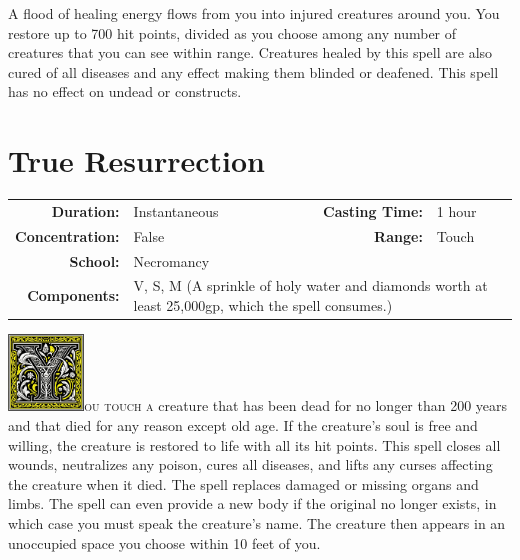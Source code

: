 \documentclass[12pt,showtrims]{memoir}
\begin{document}
\vspace{1\baselineskip}\noindent A flood of healing energy flows from you into injured creatures around you. You restore up to 700 hit points, divided as you choose among any number of creatures that you can see within range. Creatures healed by this spell are also cured of all diseases and any effect making them blinded or deafened. This spell has no effect on undead or constructs.

\newpage
{}
\newpage
\section*{True Resurrection}

{
\small\centering\vspace{-6pt}
\begin{tabular}{rlrl}
\toprule

\textbf{Duration:} & Instantaneous &
\textbf{Casting Time:} & 1 hour \\
\textbf{Concentration:} & False &
\textbf{Range:} & Touch \\
\textbf{School:} & Necromancy \\
\textbf{Components:} & \multicolumn{3}{p{0.7\textwidth}}{V, S, M (A sprinkle of holy water and diamonds worth at least 25,000gp, which the spell consumes.)}\\

\bottomrule
\end{tabular}
}
\vspace{1\baselineskip}\noindent 
\lettrine[lines=4]{\includegraphics[height=58pt]{initials/Y.png}}{ou touch a} creature that has been dead for no longer than 200 years and that died for any reason except old age. If the creature's soul is free and willing, the creature is restored to life with all its hit points. This spell closes all wounds, neutralizes any poison, cures all diseases, and lifts any curses affecting the creature when it died. The spell replaces damaged or missing organs and limbs. The spell can even provide a new body if the original no longer exists, in which case you must speak the creature's name. The creature then appears in an unoccupied space you choose within 10 feet of you.

\newpage
\end{document}
